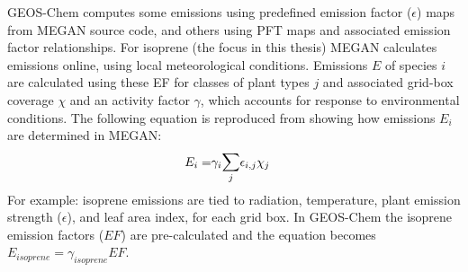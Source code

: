     GEOS-Chem computes some emissions using predefined emission factor ($\epsilon$) maps from MEGAN source code, and others using PFT maps and associated emission factor relationships.
    For isoprene (the focus in this thesis) MEGAN calculates emissions online, using local meteorological conditions.
    Emissions $E$ of species $i$ are calculated using these EF for classes of plant types $j$ and associated grid-box coverage $\chi$ and an activity factor $\gamma$, which accounts for response to environmental conditions.
    The following equation is reproduced from \textcite{Guenther2012} showing how emissions $E_i$ are determined in MEGAN: 
    \begin{eqnarray} 
    \label{Model:GC:MEGAN:eqn_emission_factors}
    E_i = & \gamma_i \mathlarger{\sum}_j{\epsilon_{i,j} \chi_j}
    \end{eqnarray}
    For example: isoprene emissions are tied to radiation, temperature, plant emission strength ($\epsilon$), and leaf area index, for each grid box.
    In GEOS-Chem the isoprene emission factors ($EF$) are pre-calculated and the equation becomes $ E_{isoprene} = \gamma_{isoprene} EF $.


